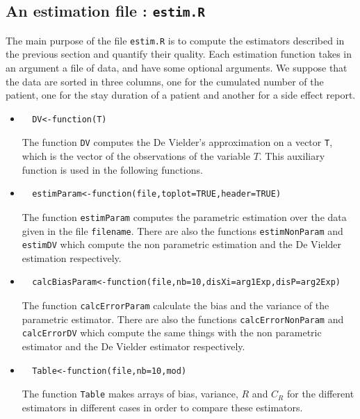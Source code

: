 \documentclass[12pt,twoside]{article}
\begin{document}
\subsection{An estimation file : \texttt{estim.R}}
The main purpose of the file \texttt{estim.R} is to compute the estimators
described in the previous section and quantify their quality. Each estimation function
takes in an argument a file of data, and have some optional arguments. We suppose that
the data are sorted in three columns, one for the cumulated number of the patient, one 
for the stay duration  of a patient and another for a side effect report.

\begin{itemize}
	\item{\begin{footnotesize}\begin{verbatim}	DV<-function(T)	\end{verbatim}\end{footnotesize}}
	The function \texttt{DV} computes the De Vielder's approximation on a vector \texttt{T}, 
	which is the vector of the observations of the variable $T$. This auxiliary function is used in the following functions.
	\item{\begin{footnotesize}\begin{verbatim}	estimParam<-function(file,toplot=TRUE,header=TRUE)	\end{verbatim}\end{footnotesize}}
	The function \texttt{estimParam} computes the parametric estimation over the data given in the file \texttt{filename}.
	There are also the functions \texttt{estimNonParam} and \texttt{estimDV} which compute 
	the non parametric estimation and the De Vielder estimation respectively.
	\item{\begin{footnotesize}\begin{verbatim}	calcBiasParam<-function(file,nb=10,disXi=arg1Exp,disP=arg2Exp)	\end{verbatim}\end{footnotesize}}
	The function \texttt{calcErrorParam} calculate the bias and the variance of the parametric estimator.
	There are also the functions \texttt{calcErrorNonParam} and \texttt{calcErrorDV} which compute the same things with
	the non parametric estimator and the De Vielder estimator respectively.
	\item{\begin{footnotesize}\begin{verbatim}	Table<-function(file,nb=10,mod)	\end{verbatim}\end{footnotesize}}
	The function \texttt{Table} makes arrays of bias, variance, $R$ and $C_R$ for the different estimators
	in different cases in order to compare these estimators.
\end{itemize}
\end{document}
